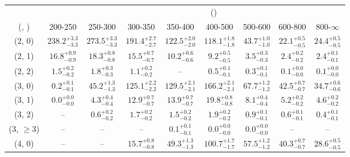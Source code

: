 \begin{table}[h!]
\tiny
\centering
{}
\begin{tabular}
{ccccccccc}
	\hline\hline
&	& \multicolumn{8}{c}{\scalht (\gev)} \\ 
	 (\njet,  \nb) & 200-250 & 250-300 & 300-350 & 350-400 & 400-500 & 500-600 & 600-800 & 800-$\infty$ \\ [0.8ex] 
\hline
	(2, 0) & $238.2^{+ 3.3 }_{- 3.3 }$ & $273.5^{+ 3.3 }_{- 3.3 }$ & $191.4^{+ 2.7 }_{- 2.7 }$ & $122.5^{+ 2.0 }_{- 2.0 }$ & $118.1^{+ 1.8 }_{- 1.8 }$ & $43.7^{+ 1.0 }_{- 1.0 }$ & $22.1^{+ 0.5 }_{- 0.5 }$ & $24.4^{+ 0.5 }_{- 0.5 }$ \\[0.5ex] 
	(2, 1) & $16.8^{+ 0.9 }_{- 0.9 }$ & $18.3^{+ 0.8 }_{- 0.8 }$ & $15.5^{+ 0.7 }_{- 0.7 }$ & $10.2^{+ 0.6 }_{- 0.6 }$ & $9.2^{+ 0.5 }_{- 0.5 }$ & $3.5^{+ 0.3 }_{- 0.3 }$ & $2.4^{+ 0.2 }_{- 0.2 }$ & $2.4^{+ 0.1 }_{- 0.1 }$ \\[0.5ex] 
	(2, 2) & $1.5^{+ 0.2 }_{- 0.2 }$ & $1.8^{+ 0.3 }_{- 0.3 }$ & $1.1^{+ 0.2 }_{- 0.2 }$ & -- & $0.5^{+ 0.1 }_{- 0.1 }$ & $0.3^{+ 0.1 }_{- 0.1 }$ & $0.1^{+ 0.0 }_{- 0.0 }$ & $0.1^{+ 0.0 }_{- 0.0 }$ \\[0.5ex] 
	(3, 0) & $0.2^{+ 0.1 }_{- 0.1 }$ & $45.2^{+ 1.3 }_{- 1.3 }$ & $125.1^{+ 2.2 }_{- 2.2 }$ & $129.5^{+ 2.1 }_{- 2.1 }$ & $166.2^{+ 2.1 }_{- 2.1 }$ & $67.7^{+ 1.2 }_{- 1.2 }$ & $42.5^{+ 0.7 }_{- 0.7 }$ & $34.7^{+ 0.6 }_{- 0.6 }$ \\[0.5ex] 
	(3, 1) & $0.0^{+ 0.0 }_{- 0.0 }$ & $4.3^{+ 0.4 }_{- 0.4 }$ & $12.9^{+ 0.7 }_{- 0.7 }$ & $13.9^{+ 0.7 }_{- 0.7 }$ & $19.8^{+ 0.8 }_{- 0.8 }$ & $8.1^{+ 0.4 }_{- 0.4 }$ & $5.2^{+ 0.2 }_{- 0.2 }$ & $4.6^{+ 0.2 }_{- 0.2 }$ \\[0.5ex] 
	(3, 2) & -- & $0.6^{+ 0.2 }_{- 0.2 }$ & $1.7^{+ 0.2 }_{- 0.2 }$ & $1.5^{+ 0.2 }_{- 0.2 }$ & $1.9^{+ 0.2 }_{- 0.2 }$ & $0.9^{+ 0.1 }_{- 0.1 }$ & $0.6^{+ 0.1 }_{- 0.1 }$ & $0.4^{+ 0.1 }_{- 0.1 }$ \\[0.5ex] 
	(3, $\ge3$) & -- & -- & -- & $0.1^{+ 0.1 }_{- 0.1 }$ & $0.0^{+ 0.0 }_{- 0.0 }$ & $0.0^{+ 0.0 }_{- 0.0 }$ & -- & -- \\[0.5ex] 
	(4, 0) & -- & -- & $15.7^{+ 0.8 }_{- 0.8 }$ & $49.3^{+ 1.3 }_{- 1.3 }$ & $100.7^{+ 1.7 }_{- 1.7 }$ & $57.5^{+ 1.2 }_{- 1.2 }$ & $40.3^{+ 0.7 }_{- 0.7 }$ & $28.6^{+ 0.5 }_{- 0.5 }$ \\[0.5ex] 

\end{tabular}
\end{table}
